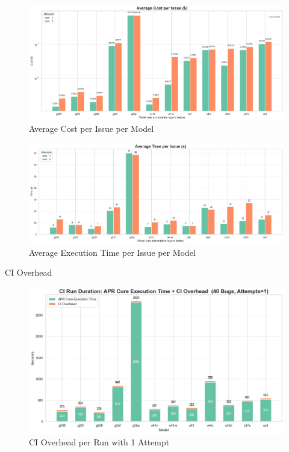 \begin{figure}[H]
    \centering
    \includegraphics[width=1\textwidth]{images/diagrams/avg_cost_per_issue_per_model_grouped.png}
    \caption{Average Cost per Issue per Model}
    \label{fig:avg-cost-per-issue}
\end{figure}

\begin{figure}[H]
    \centering
    \includegraphics[width=1\textwidth]{images/diagrams/avg_execution_time_per_issue_per_model_grouped.png}
    \caption{Average Execution Time per Issue per Model}
    \label{fig:avg-execution-time-per-issue}
\end{figure}


CI Overhead
\begin{figure}[H]
    \centering
    \includegraphics[width=1\textwidth]{images/diagrams/ci_vs_exec_time_per_run_stacked_attempts_1.png}
    \caption{CI Overhead per Run with 1 Attempt}
    \label{fig:ci-vs-exec-time-per-run-attempts-1}
\end{figure}

